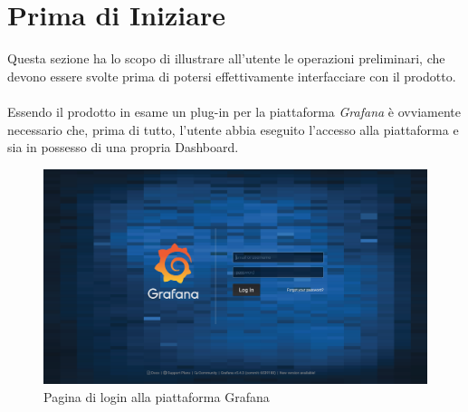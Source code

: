 \section{Prima di Iniziare}\label{PreStart}

Questa sezione ha lo scopo di illustrare all'utente le operazioni preliminari, che devono essere svolte prima di potersi effettivamente interfacciare con il prodotto.\\
~\\
Essendo il prodotto in esame un plug-in per la piattaforma \textit{Grafana} è ovviamente necessario che, prima di tutto, l'utente abbia eseguito l'accesso alla piattaforma e sia in possesso di una propria Dashboard\glossario.

\begin{figure}[H]
	\begin{center}
		\includegraphics[scale=0.3]{./images/GrafanaLogin.png}
		 \caption{Pagina di login alla piattaforma Grafana}	
		 \label{GrafanaLogin}
	\end{center}
\end{figure}
\pagebreak



\pagebreak
